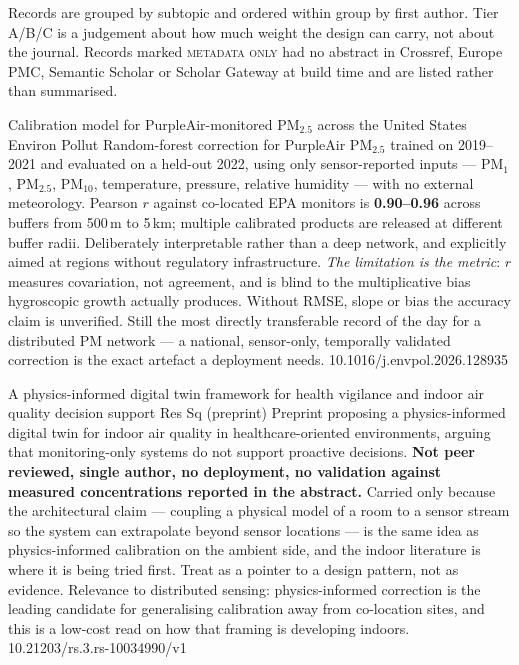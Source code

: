 \documentclass[10pt]{article}
\begin{document}
\footnotesize\noindent
Records are grouped by subtopic and ordered within group by first author. Tier A/B/C is a
judgement about how much weight the design can carry, not about the journal. Records
marked \textsc{metadata only} had no abstract in Crossref, Europe PMC, Semantic Scholar or
Scholar Gateway at build time and are listed rather than summarised.


{Calibration model for PurpleAir-monitored PM$_{2.5}$ across the United States}
{Environ Pollut}
{Random-forest correction for PurpleAir PM$_{2.5}$ trained on 2019--2021 and evaluated on
a held-out 2022, using only sensor-reported inputs --- PM$_1$, PM$_{2.5}$, PM$_{10}$,
temperature, pressure, relative humidity --- with no external meteorology. Pearson $r$
against co-located EPA monitors is \textbf{0.90--0.96} across buffers from 500\,m to
5\,km; multiple calibrated products are released at different buffer radii. Deliberately
interpretable rather than a deep network, and explicitly aimed at regions without
regulatory infrastructure. \emph{The limitation is the metric}: $r$ measures covariation,
not agreement, and is blind to the multiplicative bias hygroscopic growth actually
produces. Without RMSE, slope or bias the accuracy claim is unverified. Still the most
directly transferable record of the day for a distributed PM network --- a national,
sensor-only, temporally validated correction is the exact artefact a deployment needs.}
{10.1016/j.envpol.2026.128935}

{A physics-informed digital twin framework for health vigilance and indoor air quality
decision support}
{Res Sq (preprint)}
{Preprint proposing a physics-informed digital twin for indoor air quality in
healthcare-oriented environments, arguing that monitoring-only systems do not support
proactive decisions. \textbf{Not peer reviewed, single author, no deployment, no
validation against measured concentrations reported in the abstract.} Carried only
because the architectural claim --- coupling a physical model of a room to a sensor
stream so the system can extrapolate beyond sensor locations --- is the same idea as
physics-informed calibration on the ambient side, and the indoor literature is where it
is being tried first. Treat as a pointer to a design pattern, not as evidence. Relevance
to distributed sensing: physics-informed correction is the leading candidate for
generalising calibration away from co-location sites, and this is a low-cost read on how
that framing is developing indoors.}
{10.21203/rs.3.rs-10034990/v1}
\end{document}
